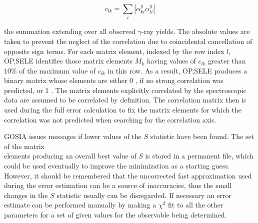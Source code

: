 \documentclass[10pt]{article}
\begin{document}
\begin{equation*}
c_{l k}=\sum_{i}\left|\alpha_{k i}^{y} \alpha_{l i}^{y}\right| \tag{6.121}
\end{equation*}


the summation extending over all observed $\gamma$-ray yields. The absolute values are taken to prevent the neglect of the correlation due to coincidental cancellation of opposite sign terms. For each matrix element, indexed by the row index $l$, OP,SELE identifies those matrix elements $M_{k}$ having values of $c_{l k}$ greater than $10 \%$ of the maximum value of $c_{l k}$ in this row. As a result, OP,SELE produces a binary matrix whose elements are either 0 , if no strong correlation was predicted, or 1 . The matrix elements explicitly correlated by the spectroscopic data are assumed to be correlated by definition. The correlation matrix then is used during the full error calculation to fix the matrix elements for which the correlation was not predicted when searching for the correlation axis.

GOSIA issues messages if lower values of the $S$ statistic have been found. The set of the matrix\\
elements producing an overall best value of $S$ is stored in a permanent file, which could be used eventually to improve the minimization as a starting guess. However, it should be remembered that the uncorrected fast approximation used during the error estimation can be a source of inaccuracies, thus the small changes in the $S$ statistic usually can be disregarded. If necessary an error estimate can be performed manually by making a $\chi^{2}$ fit to all the other parameters for a set of given values for the observable being determined.
\end{document}
